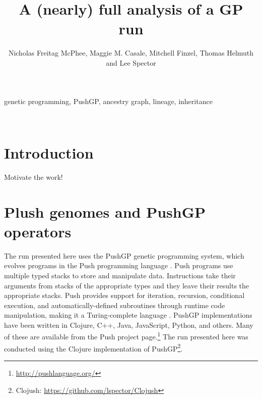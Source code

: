 %

\title*{A (nearly) full analysis of a GP run}
\author{Nicholas Freitag McPhee, Maggie M. Casale, Mitchell Finzel, Thomas Helmuth and Lee Spector}

\maketitle


\begin{keywords}
	genetic programming, PushGP, ancestry graph, lineage, inheritance
\end{keywords}
\\
\section{Introduction}
\label{sec:introduction}

Motivate the work!

\section{Plush genomes and PushGP operators}
\label{sec:background}

The run presented here uses the PushGP genetic programming system, which evolves programs in the Push programming language \citep{spector:2002:GPEM, 1068292}. Push programs use multiple typed stacks to store and manipulate data. Instructions take their arguments from stacks of the appropriate types and they leave their results the appropriate stacks. Push provides support for iteration, recursion, conditional execution, and automatically-defined subroutines through runtime code manipulation, making it a Turing-complete language \citep{1068292}. PushGP implementations have been written in Clojure, C++, Java, JavaScript, Python, and others. Many of these are available from the Push project page.\footnote{\url{http://pushlanguage.org/}} The run presented here was conducted using the Clojure implementation of PushGP\footnote{Clojush: \url{https://github.com/lspector/Clojush}}.

